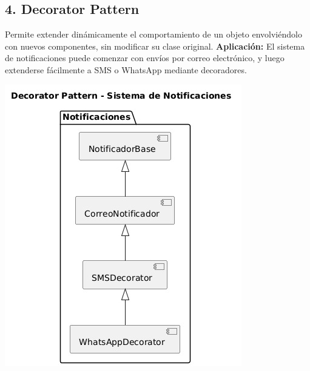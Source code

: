 	\subsection*{4. Decorator Pattern}
		\noindent Permite extender dinámicamente el comportamiento de un objeto envolviéndolo con nuevos componentes, sin modificar su clase original.  
		\textbf{Aplicación:} El sistema de notificaciones puede comenzar con envíos por correo electrónico, y luego extenderse fácilmente a SMS o WhatsApp mediante decoradores.
		\begin{center}
			\includegraphics[width=\linewidth]{figures/patterns/decorator.jpg}
			\label{fig:img12}
		\end{center}
	

